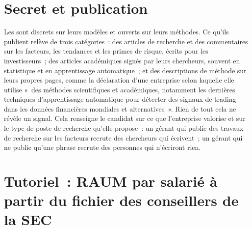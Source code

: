 \section{Secret et publication}

Les  sont discrets sur leurs modèles et ouverts sur leurs méthodes. Ce qu'ils publient relève de trois
catégories~: des articles de recherche et des commentaires sur les facteurs, les tendances et les primes de risque, écrits pour les investisseurs~; des articles académiques signés par
leurs chercheurs, souvent en statistique et en apprentissage automatique~; et des descriptions de méthode sur leurs propres pages, comme
la déclaration d'une entreprise selon laquelle elle utilise «~des méthodes scientifiques et académiques, notamment les dernières techniques d'apprentissage automatique
pour détecter des signaux de trading dans les données financières mondiales et alternatives~». Rien de tout cela ne révèle un signal. Cela renseigne le candidat sur
ce que l'entreprise valorise et sur le type de poste de recherche qu'elle propose~: un gérant qui publie des travaux de recherche sur les facteurs recrute des chercheurs qui
écrivent~; un gérant qui ne publie qu'une phrase recrute des personnes qui n'écriront rien.

\section{Tutoriel~: RAUM par salarié à partir du fichier des conseillers de la SEC}\label{tut:in:quantitative-hedge-funds-and-systematic-managers:tut}

